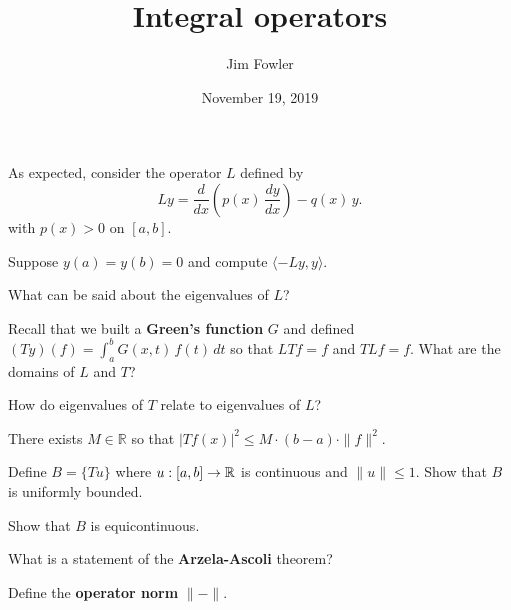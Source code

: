 \documentclass{homework}
\author{Jim Fowler}
\title{Integral operators}
\date{November 19, 2019}
\begin{document}
\maketitle

As expected, consider the operator $L$ defined by
\[
  Ly = \frac{d}{dx} \left( p(x) \, \frac{dy}{dx} \right) - q(x) \, y.
\]
with $p(x) > 0$ on $[a,b]$.

\begin{problem}
  Suppose $y(a) = y(b) = 0$ and compute $\langle -L y, y \rangle$.
\end{problem}

\begin{problem}
  What can be said about the eigenvalues of $L$?
\end{problem}

\begin{problem}
  Recall that we built a \textbf{Green's function} $G$ and defined $(Ty)(f) = \int_a^b G(x,t) \, f(t)  \, dt$ so that $LTf = f$ and $TLf = f$.  What are the domains of $L$ and $T$?
\end{problem}

\begin{problem}
  How do eigenvalues of $T$ relate to eigenvalues of $L$?
\end{problem}

\begin{problem}
  There exists $M \in \mathbb{R}$ so that $|Tf(x)|^2 \leq M \cdot (b-a) \cdot \| f \|^2$.
\end{problem}

\begin{problem}
  Define $B = \{ Tu \}$ where $u : [a,b] \to \mathbb{R}$ is continuous and
  $\|u\| \leq 1$.  Show that $B$ is uniformly bounded.
\end{problem}


\begin{problem}
  Show that $B$ is equicontinuous.
\end{problem}

\begin{problem}
  What is a statement of the \textbf{Arzela-Ascoli} theorem?
\end{problem}

\begin{problem}
  Define the \textbf{operator norm} $\| - \|$.
\end{problem}
\end{document}
